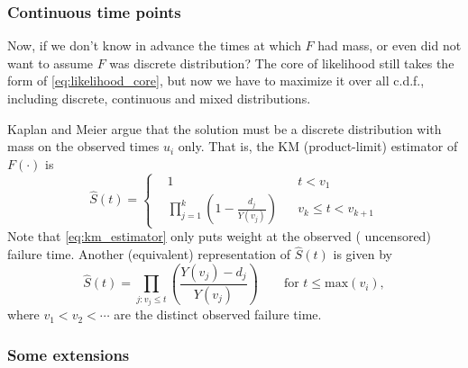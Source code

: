 \documentclass[a4paper,12pt]{article}
\begin{document}
\subsubsection{Continuous time points}
\label{sec:cont-time-points}

Now, if we don't know in advance the times at which $F$ had mass, or even did not want to assume $F$ was discrete distribution? The core of likelihood still takes the form of \eqref{eq:likelihood_core}, but now we have to maximize it over all c.d.f., including discrete, continuous and mixed distributions.
\par
Kaplan and Meier argue that the solution must be a discrete distribution with mass on the observed times $u_i$ only. That is, the KM (product-limit) estimator of $F\left(\cdot\right)$ is
\begin{equation}
  \label{eq:km_estimator}
  \hat{S}\left(t\right) =\left\{
  \begin{aligned}    
    & 1 && t < v_1    \\
    & \prod\limits_{j = 1}^{k}
      \left(1 - \frac{d_j}{Y\left(v_j\right)}\right) && v_{k} \leq t < v_{k + 1}
  \end{aligned}
  \right.  
\end{equation}
Note that \eqref{eq:km_estimator} only puts weight at the observed ({\color{red} uncensored}) failure time. Another (equivalent) representation of $\hat{S}\left(t\right)$ is given by
\begin{equation}
  \label{eq:km_estimator_2}
  \hat{S}\left(t\right) = \prod\limits_{j:v_j \leq t}\left(
    \frac{Y\left(v_j\right) - d_j}{Y\left(v_j\right)}
  \right)
  \quad\quad \text{for } t \leq \mathrm{max}\left(v_i\right)
  ,
\end{equation}
where $v_1 < v_2 < \cdots$ are the distinct observed failure time.

\subsubsection{Some extensions}
\label{sec:some-extensions}
\end{document}
